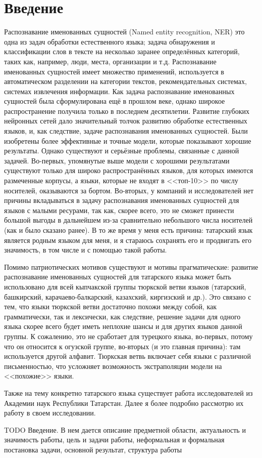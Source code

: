 \section{Введение}

Распознавание именованных сущностей (Named entity recognition, NER) это одна из задач обработки естественного языка; задача обнаружения и классификации слов в тексте на несколько заранее определённых категорий, таких как, например, люди, места, организации и т.д. Распознавание именованных сущностей имеет множество применений, используется в автоматическом разделении на категории текстов, рекомендательных системах, системах извлечения информации. Как задача распознавание именованных сущностей была сформулирована ещё в прошлом веке, однако широкое распространение получила только в последнем десятилетии. Развитие глубоких нейронных сетей дало значительный толчок развитию обработке естественных языков, и, как следствие, задаче распознавания именованных сущностей. Были изобретены более эффективные и точные модели, которые показывают хорошие результаты. Однако существуют и серьёзные проблемы, связанные с данной задачей. Во-первых, упомянутые выше модели с хорошими результатами существуют только для широко распространённых языков, для которых имеются размеченные корпусы, а языки, которые не входят в <<топ-10>> по числу носителей, оказываются за бортом. Во-вторых, у компаний и исследователей нет причины вкладываться в задачу распознавания именованных сущностей для языков с малыми ресурами, так как, скорее всего, это не сможет принести большой выгоды в дальнейшем из-за сравнительно небольшого числа носителей (как и было сказано ранее). В то же время у меня есть причина: татарский язык является родным языком для меня, и я стараюсь сохранять его и продвигать его значимость, в том числе и с помощью такой работы.

Помимо патриотических мотивов существуют и мотивы прагматические: развитие распознавание именованных сущностей для татарского языка может быть использовано для всей кыпчакской группы тюркской ветви языков (татарский, башкирский, карачаево-балкарский, казахский, киргизский и др.). Это связано с тем, что языки тюркской ветви достаточно похожи между собой, как грамматически, так и лексически, как следствие, решение задачи для одного языка скорее всего будет иметь неплохие шансы и для других языков данной группы. К сожалению, это не сработает для турецкого языка, во-первых, потому что он относится к огузской группе, во-вторых (и это главная причина): там используется другой алфавит. Тюркская ветвь включает себя языки с различной письменностью, что усложняет возможность экстраполяции модели на <<похожие>> языки.

Также на тему конкретно татарского языка существует работа \cite{Nevzorova} исследователей из Академии наук Республики Татарстан. Далее я более подробно рассмотрю их работу в своем исследовании.

TODO Введение. В нем дается описание предметной области, актуальность и значимость работы,
цель и задачи работы, неформальная и формальная постановка задачи, основной результат,
структура работы